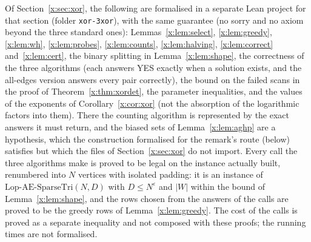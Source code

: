 \documentclass[11pt]{article}
\theoremstyle{definition}
\theoremstyle{remark}
\newcommand{\Lop}{\mathrm{Lop}\text{-}\allowbreak\mathrm{AE}\text{-}\allowbreak\mathrm{SparseTri}}
\begin{document}
Of Section~\ref{x:sec:xor}, the following are formalised in a separate Lean project for that section (folder \texttt{xor-3xor}), with the same guarantee (no sorry and no axiom beyond the three standard ones): Lemmas~\ref{x:lem:select}, \ref{x:lem:greedy}, \ref{x:lem:wh}, \ref{x:lem:probes}, \ref{x:lem:counts}, \ref{x:lem:halving}, \ref{x:lem:correct} and~\ref{x:lem:cert}, the binary splitting in Lemma~\ref{x:lem:shape}, the correctness of the three algorithms (each answers YES exactly when a solution exists, and the all-edges version answers every pair correctly), the bound on the failed scans in the proof of Theorem~\ref{x:thm:xordet}, the parameter inequalities, and the values of the exponents of Corollary~\ref{x:cor:xor} (not the absorption of the logarithmic factors into them). There the counting algorithm is represented by the exact answers it must return, and the biased sets of Lemma~\ref{x:lem:aghp} are a hypothesis, which the construction formalised for the remark's route (below) satisfies but which the files of Section~\ref{x:sec:xor} do not import. Every call the three algorithms make is proved to be legal on the instance actually built, renumbered into $N$ vertices with isolated padding: it is an instance of $\Lop(N,D)$ with $D\le N^\varepsilon$ and $|W|$ within the bound of Lemma~\ref{x:lem:shape}, and the rows chosen from the answers of the calls are proved to be the greedy rows of Lemma~\ref{x:lem:greedy}. The cost of the calls is proved as a separate inequality and not composed with these proofs; the running times are not formalised.
\end{document}

